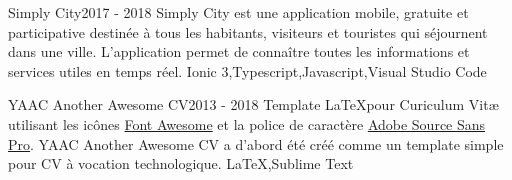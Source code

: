 %
%
%


\begin{projects}
	\project
	{Simply City}{2017 - 2018}
	{ }
	{Simply City est une application mobile, gratuite et participative destinée à tous les habitants, visiteurs et touristes qui séjournent dans une ville. L’application permet de connaître toutes les informations et services utiles en temps réel.}
	{Ionic 3,Typescript,Javascript,Visual Studio Code}
				
	\project
	{YAAC Another Awesome CV}{2013 - 2018}
	{ }
	{Template \LaTeX pour Curiculum Vitæ utilisant les icônes \href{https://fontawesome.com}{Font Awesome} et la police de caractère \href{https://fonts.google.com/specimen/Source+Sans+Pro}{Adobe Source Sans Pro}. YAAC Another Awesome CV a d'abord été créé comme un template simple pour CV à vocation technologique.}
	{\LaTeX,Sublime Text}

\end{projects}



